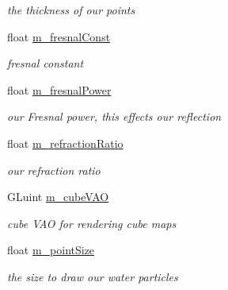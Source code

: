 \begin{DoxyCompactItemize}
\begin{DoxyCompactList}\small\item\em the thickness of our points \end{DoxyCompactList}\item 
\hypertarget{class_fluid_shader_aef86b483692d6e7c8fa5349ef6c53f19}{float \hyperlink{class_fluid_shader_aef86b483692d6e7c8fa5349ef6c53f19}{m\-\_\-fresnal\-Const}}\label{class_fluid_shader_aef86b483692d6e7c8fa5349ef6c53f19}

\begin{DoxyCompactList}\small\item\em fresnal constant \end{DoxyCompactList}\item 
\hypertarget{class_fluid_shader_a7959268c3e8f2371debe83375cc3113c}{float \hyperlink{class_fluid_shader_a7959268c3e8f2371debe83375cc3113c}{m\-\_\-fresnal\-Power}}\label{class_fluid_shader_a7959268c3e8f2371debe83375cc3113c}

\begin{DoxyCompactList}\small\item\em our Fresnal power, this effects our reflection \end{DoxyCompactList}\item 
\hypertarget{class_fluid_shader_a59895f7e705bf3c0c874d61a03e24324}{float \hyperlink{class_fluid_shader_a59895f7e705bf3c0c874d61a03e24324}{m\-\_\-refraction\-Ratio}}\label{class_fluid_shader_a59895f7e705bf3c0c874d61a03e24324}

\begin{DoxyCompactList}\small\item\em our refraction ratio \end{DoxyCompactList}\item 
\hypertarget{class_fluid_shader_a00339308061f3acdd4ae9d2ee019e0c4}{G\-Luint \hyperlink{class_fluid_shader_a00339308061f3acdd4ae9d2ee019e0c4}{m\-\_\-cube\-V\-A\-O}}\label{class_fluid_shader_a00339308061f3acdd4ae9d2ee019e0c4}

\begin{DoxyCompactList}\small\item\em cube V\-A\-O for rendering cube maps \end{DoxyCompactList}\item 
\hypertarget{class_fluid_shader_a93f87bf852746ded66803552309534e6}{float \hyperlink{class_fluid_shader_a93f87bf852746ded66803552309534e6}{m\-\_\-point\-Size}}\label{class_fluid_shader_a93f87bf852746ded66803552309534e6}

\begin{DoxyCompactList}\small\item\em the size to draw our water particles \end{DoxyCompactList}\end{DoxyCompactItemize}
